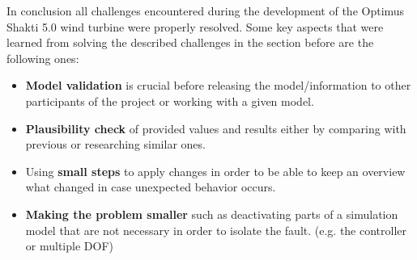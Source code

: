 In conclusion all challenges encountered during the development of the Optimus Shakti 5.0 wind turbine were properly resolved.
Some key aspects that were learned from solving the described challenges in the section before are the following ones:
\begin{itemize}
	\item \textbf{Model validation} is crucial before releasing the model/information to other participants of the project or working with a given model.
	\item \textbf{Plausibility check} of provided values and results either by comparing with previous or researching similar ones.
	\item Using \textbf{small steps} to apply changes in order to be able to keep an overview what changed in case unexpected behavior occurs.
	\item \textbf{Making the problem smaller} such as deactivating parts of a simulation model  that are not necessary in order to isolate the fault. (e.g. the controller or multiple \gls{DOF}) 
\end{itemize}
